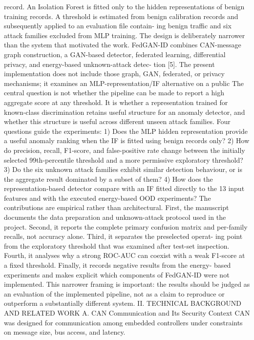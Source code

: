 \documentclass[
]{article}
\begin{document}
record. An Isolation Forest is fitted only to the hidden representations
of benign training records. A threshold is estimated from benign
calibration records and subsequently applied to an evaluation file
contain- ing benign traffic and six attack families excluded from MLP
training. The design is deliberately narrower than the system that
motivated the work. FedGAN-ID combines CAN-message graph construction, a
GAN-based detector, federated learning, differential privacy, and
energy-based unknown-attack detec- tion {[}5{]}. The present
implementation does not include those graph, GAN, federated, or privacy
mechanisms; it examines an MLP-representation/IF alternative on a public
The central question is not whether the pipeline can be made to report a
high aggregate score at any threshold. It is whether a representation
trained for known-class discrimination retains useful structure for an
anomaly detector, and whether this structure is useful across different
unseen attack families. Four questions guide the experiments: 1) Does
the MLP hidden representation provide a useful anomaly ranking when the
IF is fitted using benign records only? 2) How do precision, recall,
F1-score, and false-positive rate change between the initially selected
99th-percentile threshold and a more permissive exploratory threshold?
3) Do the six unknown attack families exhibit similar detection
behaviour, or is the aggregate result dominated by a subset of them? 4)
How does the representation-based detector compare with an IF fitted
directly to the 13 input features and with the executed energy-based OOD
experiments? The contributions are empirical rather than architectural.
First, the manuscript documents the data preparation and unknown-attack
protocol used in the project. Second, it reports the complete primary
confusion matrix and per-family recalls, not accuracy alone. Third, it
separates the preselected operat- ing point from the exploratory
threshold that was examined after test-set inspection. Fourth, it
analyses why a strong ROC-AUC can coexist with a weak F1-score at a
fixed threshold. Finally, it records negative results from the energy-
based experiments and makes explicit which components of FedGAN-ID were
not implemented. This narrower framing is important: the results should
be judged as an evaluation of the implemented pipeline, not as a claim
to reproduce or outperform a substantially different system. II.
TECHNICAL BACKGROUND AND RELATED WORK A. CAN Communication and Its
Security Context CAN was designed for communication among embedded
controllers under constraints on message size, bus access, and latency.
\end{document}
